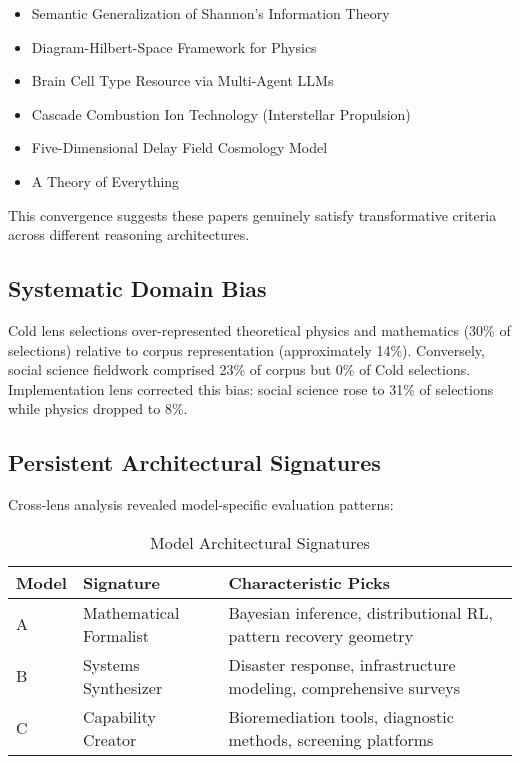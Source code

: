 \documentclass{article}
\begin{document}
\begin{itemize}
    \item Semantic Generalization of Shannon's Information Theory
    \item Diagram-Hilbert-Space Framework for Physics
    \item Brain Cell Type Resource via Multi-Agent LLMs
    \item Cascade Combustion Ion Technology (Interstellar Propulsion)
    \item Five-Dimensional Delay Field Cosmology Model
    \item A Theory of Everything
\end{itemize}

This convergence suggests these papers genuinely satisfy transformative criteria across different reasoning architectures.

\subsection{Systematic Domain Bias}

Cold lens selections over-represented theoretical physics and mathematics (30\% of selections) relative to corpus representation (approximately 14\%). Conversely, social science fieldwork comprised 23\% of corpus but 0\% of Cold selections. Implementation lens corrected this bias: social science rose to 31\% of selections while physics dropped to 8\%.

\subsection{Persistent Architectural Signatures}

Cross-lens analysis revealed model-specific evaluation patterns:

\begin{table}[htbp]
\centering
\caption{Model Architectural Signatures}
\label{tab:signatures}
\begin{tabular}{p{1cm}p{2.5cm}p{3.5cm}}
\toprule
\textbf{Model} & \textbf{Signature} & \textbf{Characteristic Picks} \\
\midrule
A & Mathematical Formalist & Bayesian inference, distributional RL, pattern recovery geometry \\
B & Systems Synthesizer & Disaster response, infrastructure modeling, comprehensive surveys \\
C & Capability Creator & Bioremediation tools, diagnostic methods, screening platforms \\
\bottomrule
\end{tabular}
\end{table}
\end{document}
